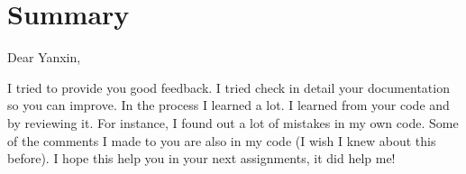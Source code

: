 \documentclass[11 pt]{article}
\begin{document}
\section{Summary}
Dear Yanxin, 

I tried to provide you good feedback. I tried check in detail your documentation so you can improve. In the process I learned a lot. I learned from your code and by reviewing it. For instance, I found out a lot of mistakes in my own code. Some of the comments I made to you are also in my code (I wish I knew about this before). I hope this help you in your next assignments, it did help me! 
\end{document}
